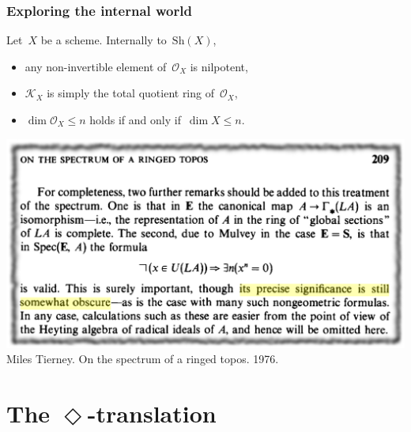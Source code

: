 \documentclass[12pt,utf8,notheorems,compress,t]{beamer}
\renewcommand{\O}{\mathcal{O}}
\newcommand{\K}{\mathcal{K}}
\newcommand{\Sh}{\mathrm{Sh}}
\renewcommand{\_}{\mathpunct{.}}
\newcommand{\?}{\,{:}\,}
\begin{document}
\begin{frame}\frametitle{Exploring the internal world}
  Let~$X$ be a scheme. Internally to~$\Sh(X)$,
  \begin{itemize}
    \item any non-invertible element of~$\O_X$ is nilpotent,
    \item $\K_X$ is simply the total quotient ring of~$\O_X$,
    \item $\dim \O_X \leq n$ holds if and only if~$\dim X \leq n$.
  \end{itemize}

  \centering
  \includegraphics[scale=0.3]{images/tierney-on-the-spectrum-of-a-ringed-topos} \\
  \tiny
  Miles Tierney. On the spectrum of a ringed topos. 1976.
  \par
\end{frame}


\section{\texorpdfstring{The $\Diamond$-translation}{The ♦-translation}}  %

\newcommand{\idiamond}{{\usebeamercolor[fg]{item}{\boldsymbol{\Diamond}}}}
\newcommand{\gdiamond}[1]{\textcolor{gray}{\boldsymbol{\Diamond}(}#1\textcolor{gray}{)}}
\end{document}
